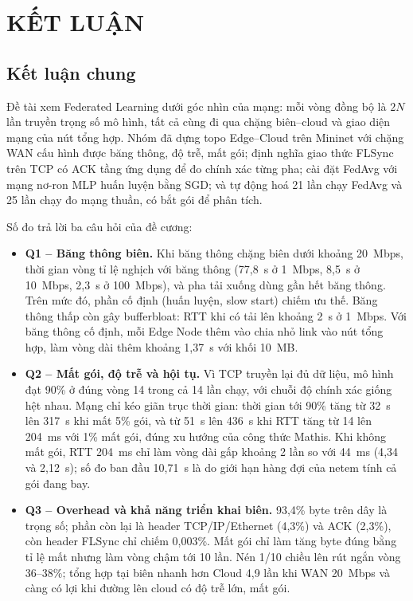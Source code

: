 \section*{\centering KẾT LUẬN}

\subsection*{Kết luận chung}
Đề tài xem Federated Learning dưới góc nhìn của mạng: mỗi vòng đồng bộ là $2N$ lần truyền trọng số mô hình, tất cả cùng đi qua chặng biên--cloud và giao diện mạng của nút tổng hợp. Nhóm đã dựng topo Edge--Cloud trên Mininet với chặng WAN cấu hình được băng thông, độ trễ, mất gói; định nghĩa giao thức FLSync trên TCP có ACK tầng ứng dụng để đo chính xác từng pha; cài đặt FedAvg với mạng nơ-ron MLP huấn luyện bằng SGD; và tự động hoá 21 lần chạy FedAvg và 25 lần chạy đo mạng thuần, có bắt gói để phân tích.

Số đo trả lời ba câu hỏi của đề cương:
\begin{itemize}
    \item \textbf{Q1 -- Băng thông biên.} Khi băng thông chặng biên dưới khoảng 20~Mbps, thời gian vòng tỉ lệ nghịch với băng thông (77{,}8~s ở 1~Mbps, 8{,}5~s ở 10~Mbps, 2{,}3~s ở 100~Mbps), và pha tải xuống dùng gần hết băng thông. Trên mức đó, phần cố định (huấn luyện, slow start) chiếm ưu thế. Băng thông thấp còn gây bufferbloat: RTT khi có tải lên khoảng 2~s ở 1~Mbps. Với băng thông cố định, mỗi Edge Node thêm vào chia nhỏ link vào nút tổng hợp, làm vòng dài thêm khoảng 1{,}37~s với khối 10~MB.
    \item \textbf{Q2 -- Mất gói, độ trễ và hội tụ.} Vì TCP truyền lại đủ dữ liệu, mô hình đạt 90\% ở đúng vòng 14 trong cả 14 lần chạy, với chuỗi độ chính xác giống hệt nhau. Mạng chỉ kéo giãn trục thời gian: thời gian tới 90\% tăng từ 32~s lên 317~s khi mất 5\% gói, và từ 51~s lên 436~s khi RTT tăng từ 14 lên 204~ms với 1\% mất gói, đúng xu hướng của công thức Mathis. Khi không mất gói, RTT 204~ms chỉ làm vòng dài gấp khoảng 2 lần so với 44~ms (4{,}34 và 2{,}12~s); số đo ban đầu 10{,}71~s là do giới hạn hàng đợi của netem tính cả gói đang bay.
    \item \textbf{Q3 -- Overhead và khả năng triển khai biên.} 93{,}4\% byte trên dây là trọng số; phần còn lại là header TCP/IP/Ethernet (4{,}3\%) và ACK (2{,}3\%), còn header FLSync chỉ chiếm 0{,}003\%. Mất gói chỉ làm tăng byte đúng bằng tỉ lệ mất nhưng làm vòng chậm tới 10 lần. Nén 1/10 chiều lên rút ngắn vòng 36--38\%; tổng hợp tại biên nhanh hơn Cloud 4{,}9 lần khi WAN 20~Mbps và càng có lợi khi đường lên cloud có độ trễ lớn, mất gói.
\end{itemize}

